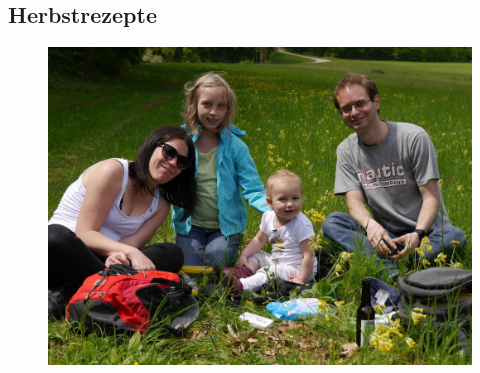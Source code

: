\documentclass[%
a4paper,
twoside,
12pt
]{article}
\begin{document}
\begin{otherlanguage}{ngerman}
\subsection{Herbstrezepte}
\begin{figure}[h]
	\includegraphics[width=\textwidth]{pic/US}
\end{figure}











\cleardoublepage

\end{otherlanguage}
\end{document}
